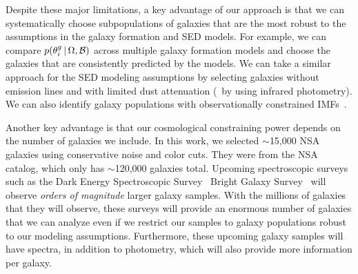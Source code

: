 Despite these major limitations, a key advantage of our approach is that we can
systematically choose subpopulations of galaxies that are the most robust to
the assumptions in the galaxy formation and SED models. 
For example, we can compare 
$p(\theta^g_i\,|\,\Omega, \mathcal{B})$ across multiple galaxy formation
models and choose the galaxies that are consistently predicted by the models. 
We can take a similar approach for the SED modeling assumptions by selecting
galaxies without emission lines and  with limited dust attenuation (\eg~by
using infrared photometry). 
We can also identify galaxy populations with observationally constrained
IMFs~\citep{myers2013, smith2015a}.

Another key advantage is that our cosmological constraining power depends on
the number of galaxies we include. 
In this work, we selected $\sim$15,000 NSA galaxies using conservative noise
and color cuts.
They were from the NSA catalog, which only has $\sim$120,000 galaxies total.
Upcoming spectroscopic surveys such as the Dark Energy Spectroscopic
Survey~\citep[DESI;][]{desicollaboration2016, desicollaboration2016a,
abareshi2022} Bright Galaxy Survey~\citep[BGS;][]{hahn2022c} will observe 
{\em orders of magnitude} larger galaxy samples. 
With the millions of galaxies that they will observe, these surveys will
provide an enormous number of galaxies that we can analyze even if we restrict
our samples to galaxy populations robust to our modeling assumptions.
Furthermore, these upcoming galaxy samples will have spectra, in addition to
photometry, which will also provide more information per galaxy. 
